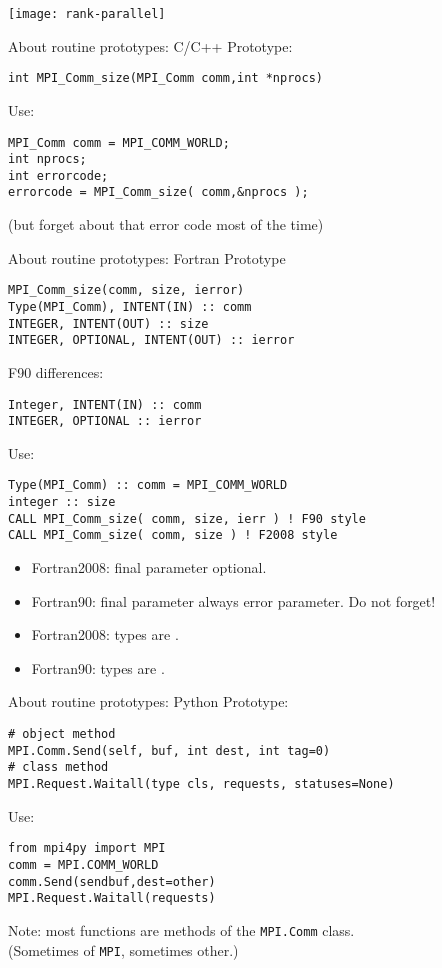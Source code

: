 \begin{frame}
  \texttt{[image: rank-parallel]}
\end{frame}

\begin{frame}[containsverbatim]{About routine prototypes: C/C++}
  \label{sec:protos}
Prototype:
\lstset{language=C}
\begin{lstlisting}
int MPI_Comm_size(MPI_Comm comm,int *nprocs)
\end{lstlisting}
Use:
\lstset{language=C}
\begin{lstlisting}
MPI_Comm comm = MPI_COMM_WORLD;
int nprocs;
int errorcode;
errorcode = MPI_Comm_size( comm,&nprocs );
\end{lstlisting}
(but forget about that error code most of the time)
\end{frame}

\begin{mpithree}
\begin{frame}[containsverbatim]{About routine prototypes: Fortran}
Prototype
\lstset{language=Fortran}
\begin{lstlisting}
MPI_Comm_size(comm, size, ierror)
Type(MPI_Comm), INTENT(IN) :: comm
INTEGER, INTENT(OUT) :: size
INTEGER, OPTIONAL, INTENT(OUT) :: ierror
\end{lstlisting}
F90 differences:
\begin{lstlisting}
Integer, INTENT(IN) :: comm
INTEGER, OPTIONAL :: ierror
\end{lstlisting}
Use:
\begin{lstlisting}
Type(MPI_Comm) :: comm = MPI_COMM_WORLD
integer :: size
CALL MPI_Comm_size( comm, size, ierr ) ! F90 style
CALL MPI_Comm_size( comm, size ) ! F2008 style
\end{lstlisting}
\begin{itemize}
\item Fortran2008: final parameter optional.
\item Fortran90: final parameter always error parameter. Do not
  forget!
\item Fortran2008:  types are .
\item Fortran90:  types are .
\end{itemize}
\end{frame}
\end{mpithree}

\begin{frame}[containsverbatim]{About routine prototypes: Python}
Prototype:
\lstset{language=Python}
\begin{lstlisting}
# object method
MPI.Comm.Send(self, buf, int dest, int tag=0)
# class method
MPI.Request.Waitall(type cls, requests, statuses=None)
\end{lstlisting}
Use:
\begin{lstlisting}
from mpi4py import MPI
comm = MPI.COMM_WORLD
comm.Send(sendbuf,dest=other)
MPI.Request.Waitall(requests)
\end{lstlisting}
Note: most functions are methods of the \lstinline{MPI.Comm} class.\\
(Sometimes of \lstinline{MPI}, sometimes other.)
\end{frame}

